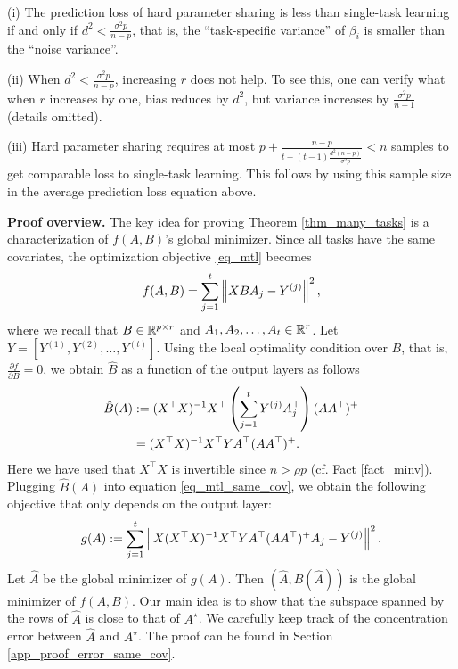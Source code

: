(i) The prediction loss of hard parameter sharing is less than single-task learning if and only if ${d^2}{} < \frac{\sigma^2 p}{n - p}$, that is, the ``task-specific variance'' of $\beta_i$ is smaller than the ``noise variance''.

(ii) When ${d^2}{} < \frac{\sigma^2 p}{n - p}$, increasing $r$ does not help.
	To see this, one can verify what when $r$ increases by one, bias reduces by ${d^2}{}$, but variance increases by $\frac{\sigma^2 p}{n-1}$ (details omitted).

(iii) Hard parameter sharing requires at most $p + \frac{n - p}{t - (t - 1)\frac{d^2 (n - p)}{\sigma^2 p}} < n$ samples to get comparable loss to single-task learning.
	This follows by using this sample size in the average prediction loss equation above.


\textbf{Proof overview.} The key idea for proving Theorem \ref{thm_many_tasks} is a characterization of $f(A, B)$'s global minimizer.
	Since all tasks have the same covariates, the optimization objective \eqref{eq_mtl} becomes
	\begin{align}
		f(A, B) = \sum_{j=1}^t \left\| X B A_j - Y^{(j)} \right\|^2, \label{eq_mtl_same_cov}
	\end{align}
	where we recall that $B \in \mathbb{R}^{p \times r}$ and $A_1, A_2, \dots, A_t \in \mathbb{R}^r$.
	Let $Y = [Y^{(1)}, Y^{(2)}, \dots, Y^{(t)}]$.
	Using the local optimality condition over $B$, that is, $\frac{\partial f}{\partial B} = 0$, we obtain $\hat{B}$ as a function of the output layers as follows
	\begin{align}
		\hat{B}(A) &:= (X^{\top}X)^{-1} X^{\top} \left({\sum_{j=1}^t Y^{(j)} A_j^{\top}}\right) (A  A^{\top})^{+} \nonumber \\
		&= (X^{\top} X)^{-1} X^{\top} Y A^{\top} (AA^{\top})^{+}. \label{eq_Bhat}
	\end{align}
	Here we have used that $X^{\top}X$ is invertible since $n > \rho p$ (cf. Fact \ref{fact_minv}).
	Plugging $\hat{B}(A)$ into equation \eqref{eq_mtl_same_cov}, we obtain the following objective that only depends on the output layer:
	\begin{align}
		g(A) := \sum_{j=1}^t \left\| X (X^{\top}X)^{-1}X^{\top} Y A^{\top} (AA^{\top})^{+} A_j - Y^{(j)} \right\|^2. \label{eq_mtl_output_layer}
	\end{align}
	Let $\hat{A}$ be the global minimizer of $g(A)$. Then  $(\hat{A}, \hat{B}(\hat A))$ is the global minimizer of $f(A, B)$. 
	Our main idea is to show that the subspace spanned by the rows of $\hat{A}$ is close to that of $A^{\star}$.
	We carefully keep track of the concentration error between $\hat{A}$ and $A^{\star}$.
	The proof can be found in Section \ref{app_proof_error_same_cov}.
